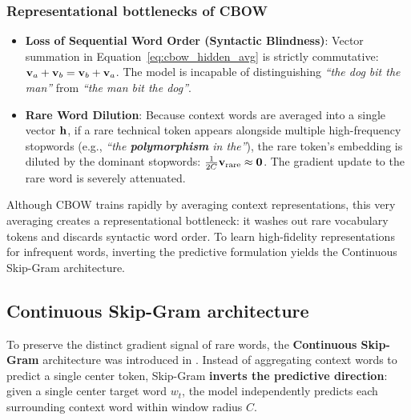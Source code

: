 \documentclass[../../../main.tex]{subfiles}
\begin{document}
\subsubsection{Representational bottlenecks of CBOW}
\begin{itemize}
    \item \textbf{Loss of Sequential Word Order (Syntactic Blindness)}: Vector summation in Equation~\eqref{eq:cbow_hidden_avg} is strictly commutative: $\mathbf{v}_a + \mathbf{v}_b = \mathbf{v}_b + \mathbf{v}_a$. The model is incapable of distinguishing \emph{``the dog bit the man''} from \emph{``the man bit the dog''}.
    \item \textbf{Rare Word Dilution}: Because context words are averaged into a single vector $\mathbf{h}$, if a rare technical token appears alongside multiple high-frequency stopwords (e.g., \emph{``the \textbf{polymorphism} in the''}), the rare token's embedding is diluted by the dominant stopwords: $\frac{1}{2C} \mathbf{v}_{\text{rare}} \approx \mathbf{0}$. The gradient update to the rare word is severely attenuated.
\end{itemize}

Although CBOW trains rapidly by averaging context representations, this very averaging creates a representational bottleneck: it washes out rare vocabulary tokens and discards syntactic word order. To learn high-fidelity representations for infrequent words, inverting the predictive formulation yields the Continuous Skip-Gram architecture.

\clearpage


\subsection{Continuous Skip-Gram architecture}
\label{sec:skipgram_architecture}

To preserve the distinct gradient signal of rare words, the \textbf{Continuous Skip-Gram} architecture was introduced in \cite{mikolov2013efficient}. Instead of aggregating context words to predict a single center token, Skip-Gram \textbf{inverts the predictive direction}: given a single center target word $w_t$, the model independently predicts each surrounding context word within window radius $C$.
\end{document}
